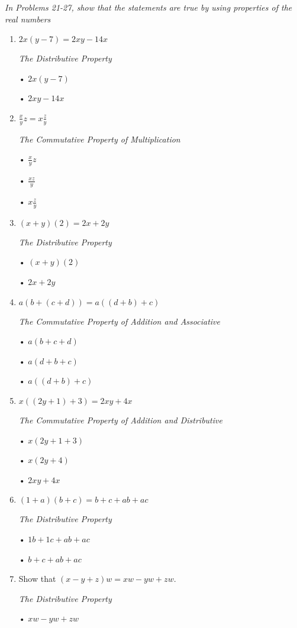 \documentclass{article}
\begin{document}
\textit{In Problems 21-27, show that the statements are true by using properties of the real numbers}
\begin{enumerate}[start=21]
    \item $2x(y-7) = 2xy - 14x$\par
    \begin{center}
        \textit{The Distributive Property}\par
        • $2x(y-7)$\par
        • $2xy - 14x$
    \end{center}

    \item $\frac{x}{y}z = x\frac{z}{y}$
    \begin{center}
        \textit{The Commutative Property of Multiplication}\par
        • $\frac{x}{y} z$\par
        • $\frac{xz}{y}$\par
        • $x \frac{z}{y}$
    \end{center}

    \item $(x + y)(2) = 2x + 2y$
    \begin{center}
        \textit{The Distributive Property}\par
        • $(x + y)(2)$\par
        • $2x + 2y$
    \end{center}
    
    \item $a(b + (c + d)) = a((d + b) + c)$
    \begin{center}
        \textit{The Commutative Property of Addition and Associative}\par
        • $a(b + c + d)$\par
        • $a(d + b + c)$\par
        • $a((d + b) + c)$
    \end{center}

    \item $x((2y + 1) + 3) = 2xy + 4x$
    \begin{center}
        \textit{The Commutative Property of Addition and Distributive}\par
        • $x(2y + 1 + 3)$\par
        • $x(2y + 4)$\par
        • $2xy + 4x$
    \end{center}
    
    \item $(1 + a)(b + c) = b + c + ab + ac$
    \begin{center}
        \textit{The Distributive Property}\par
        • $1b + 1c + ab + ac$\par
        • $b + c + ab + ac$
    \end{center}

    \item Show that $(x - y + z)w = xw - yw + zw$.\par
    [\textit{Hint: $b + c + d = (b + c) + d$}]\par
    \begin{center}
        \textit{The Distributive Property}\par
        • $xw - yw + zw$
    \end{center}
\end{enumerate}
\end{document}
